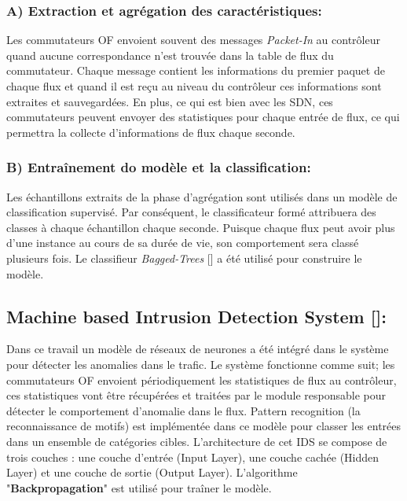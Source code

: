 \subsubsection{A) Extraction et agrégation des caractéristiques:}
Les commutateurs OF envoient souvent des messages \textit{Packet-In} au contrôleur quand aucune correspondance n’est trouvée dans la table de flux du commutateur. Chaque message contient les informations du premier paquet de chaque flux et quand il est reçu au niveau du contrôleur ces informations sont extraites et sauvegardées. En plus, ce qui est bien avec les SDN, ces commutateurs peuvent envoyer des statistiques pour chaque entrée de flux, ce qui permettra la collecte d'informations de flux chaque seconde. 

\subsubsection{B) Entraînement do modèle et la classification:}
Les échantillons extraits de la phase d’agrégation sont utilisés dans un modèle de classification supervisé. Par conséquent, le classificateur formé attribuera des classes à chaque échantillon chaque seconde. Puisque chaque flux peut avoir plus d’une instance au cours de sa durée de vie, son comportement sera classé plusieurs fois. Le classifieur \textit{Bagged-Trees} [\cite{12}] a été utilisé pour construire le modèle.
\newpage
\subsection{Machine based Intrusion Detection System [\cite{13}]:}
Dans ce travail un modèle de réseaux de neurones a été intégré dans le système pour détecter les anomalies dans le trafic. Le système fonctionne comme suit; les commutateurs OF envoient périodiquement les statistiques de flux au contrôleur, ces statistiques vont être récupérées et traitées par le module responsable pour détecter le comportement d’anomalie dans le flux. Pattern recognition (la reconnaissance de motifs) est implémentée dans ce modèle pour classer les entrées dans un ensemble de catégories cibles. L’architecture de cet IDS se compose de trois couches : une couche d’entrée (Input Layer), une couche cachée (Hidden Layer) et une couche de sortie (Output Layer). L’algorithme "\textbf{Backpropagation}" est utilisé pour traîner le modèle.\\

